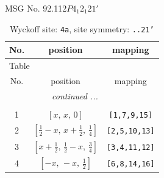 \documentclass[fleqn,8pt]{jsarticle}
\begin{document}
\setcounter{MaxMatrixCols}{32}

\renewcommand{\tablename}{Table~}
\renewcommand{\figurename}{Figure~}
\begin{center}
\LARGE
MSG No. 92.112\quad$P4_{1}2_{1}21'$
\end{center}
\renewcommand{\arraystretch}{1.2}
\begin{longtable}{ccc}
\caption{Wyckoff site: {\tt 4a}, site symmetry: {\tt ..21'}}
 \\
 \hline \hline
No. & position & mapping \\ \hline \endfirsthead

\multicolumn{2}{l}{\tablename\ \thetable{}} \\
 \hline \hline
No. & position & mapping \\ \hline \endhead

 \hline \hline
\multicolumn{2}{r}{\footnotesize\it continued ...} \\ \endfoot

 \hline \hline
\multicolumn{2}{r}{} \\ \endlastfoot

1 & $\left[ x,\, x,\, 0 \right]$ & {\tt [1,7,9,15]} \\ \hline
2 & $\left[ \frac{1}{2} - x,\, x + \frac{1}{2},\, \frac{1}{4} \right]$ & {\tt [2,5,10,13]} \\ \hline
3 & $\left[ x + \frac{1}{2},\, \frac{1}{2} - x,\, \frac{3}{4} \right]$ & {\tt [3,4,11,12]} \\ \hline
4 & $\left[ - x,\, - x,\, \frac{1}{2} \right]$ & {\tt [6,8,14,16]} \\
\end{longtable}
\renewcommand{\arraystretch}{1.2}
\end{document}
